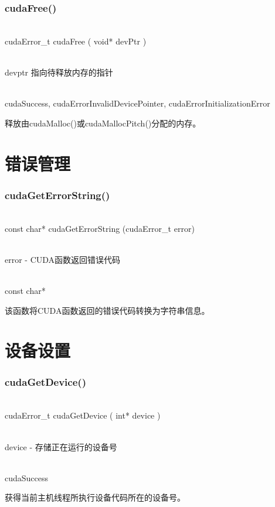 \subsubsection{cudaFree()}
\begin{cnfrmfunc}
   \item{}\\
      ​cudaError\_t cudaFree ( void* devPtr )
   \item{}\\
     devptr 指向待释放内存的指针
   \item{}\\
     cudaSuccess, cudaErrorInvalidDevicePointer, cudaErrorInitializationError
\end{cnfrmfunc}
释放由cudaMalloc()或cudaMallocPitch()分配的内存。
\section{错误管理}\label{cuda/err}
\subsubsection{cudaGetErrorString()}
\begin{cnfrmfunc}
\item{}\\
const char* cudaGetErrorString (cudaError\_t error) 
\item{}\\
error - CUDA函数返回错误代码\\
\item{}\\
const char*
\end{cnfrmfunc}
该函数将CUDA函数返回的错误代码转换为字符串信息。

\section{设备设置}\label{cuda/basic/device}
\subsubsection{cudaGetDevice()}
\begin{cnfrmfunc}
\item{}\\
cudaError\_t cudaGetDevice ( int* device ) 
\item{}\\
device - 存储正在运行的设备号\\
\item{}\\
cudaSuccess
\end{cnfrmfunc}
获得当前主机线程所执行设备代码所在的设备号。
